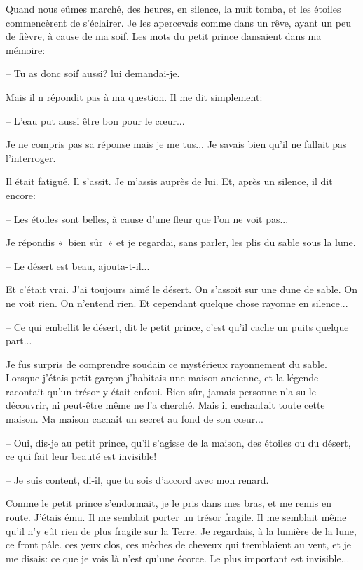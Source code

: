 \documentclass[a4paper]{report}
\begin{document}
Quand nous eûmes marché, des heures, en silence, la nuit tomba, et les étoiles commencèrent de s'éclairer. Je les apercevais comme dans un rêve, ayant un peu de fièvre, à cause de ma soif. Les mots du petit prince dansaient dans ma mémoire:

-- Tu as donc soif aussi? lui demandai-je.

Mais il n répondit pas à ma question. Il me dit simplement:

-- L'eau put aussi être bon pour le cœur...

Je ne compris pas sa réponse mais je me tus... Je savais bien qu'il ne fallait pas l'interroger.

Il était fatigué. Il s'assit. Je m'assis auprès de lui. Et, après un silence, il dit encore:

-- Les étoiles sont belles, à cause d'une fleur que l'on ne voit pas...

Je répondis «~bien sûr~» et je regardai, sans parler, les plis du sable sous la lune.

-- Le désert est beau, ajouta-t-il...

Et c'était vrai. J'ai toujours aimé le désert. On s'assoit sur une dune de sable. On ne voit rien. On n'entend rien. Et cependant quelque chose rayonne en silence...

-- Ce qui embellit le désert, dit le petit prince, c'est qu'il cache un puits quelque part...

Je fus surpris de comprendre soudain ce mystérieux rayonnement du sable. Lorsque j'étais petit garçon j'habitais une maison ancienne, et la légende racontait qu'un trésor y était enfoui. Bien sûr, jamais personne n'a su le découvrir, ni peut-être même ne l'a cherché. Mais il enchantait toute cette maison. Ma maison cachait un secret au fond de son cœur...

-- Oui, dis-je au petit prince, qu'il s'agisse de la maison, des étoiles ou du désert, ce qui fait leur beauté est invisible!

-- Je suis content, di-il, que tu sois d'accord avec mon renard.

Comme le petit prince s'endormait, je le pris dans mes bras, et me remis en route. J'étais ému. Il me semblait porter un trésor fragile. Il me semblait même qu'il n'y eût rien de plus fragile sur la Terre. Je regardais, à la lumière de la lune, ce front pâle. ces yeux clos, ces mèches de cheveux qui tremblaient au vent, et je me disais: ce que je vois là n'est qu'une écorce. Le plus important est invisible...
\end{document}
